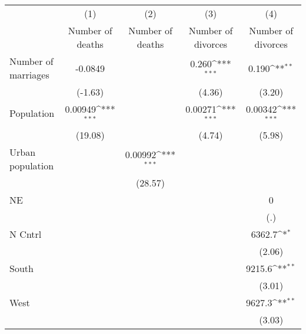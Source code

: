 {
\def\sym#1{\ifmmode^{#1}\else\(^{#1}\)\fi}
\begin{tabular}{l*{4}{c}}
\hline\hline
                    &\multicolumn{1}{c}{(1)}&\multicolumn{1}{c}{(2)}&\multicolumn{1}{c}{(3)}&\multicolumn{1}{c}{(4)}\\
                    &\multicolumn{1}{c}{Number of deaths}&\multicolumn{1}{c}{Number of deaths}&\multicolumn{1}{c}{Number of divorces}&\multicolumn{1}{c}{Number of divorces}\\
\hline
Number of marriages &     -0.0849         &                     &       0.260\sym{***}&       0.190\sym{**} \\
                    &     (-1.63)         &                     &      (4.36)         &      (3.20)         \\
[1em]
Population          &     0.00949\sym{***}&                     &     0.00271\sym{***}&     0.00342\sym{***}\\
                    &     (19.08)         &                     &      (4.74)         &      (5.98)         \\
[1em]
Urban population    &                     &     0.00992\sym{***}&                     &                     \\
                    &                     &     (28.57)         &                     &                     \\
[1em]
NE                  &                     &                     &                     &           0         \\
                    &                     &                     &                     &         (.)         \\
[1em]
N Cntrl             &                     &                     &                     &      6362.7\sym{*}  \\
                    &                     &                     &                     &      (2.06)         \\
[1em]
South               &                     &                     &                     &      9215.6\sym{**} \\
                    &                     &                     &                     &      (3.01)         \\
[1em]
West                &                     &                     &                     &      9627.3\sym{**} \\
                    &                     &                     &                     &      (3.03)         \\

\end{tabular}}
